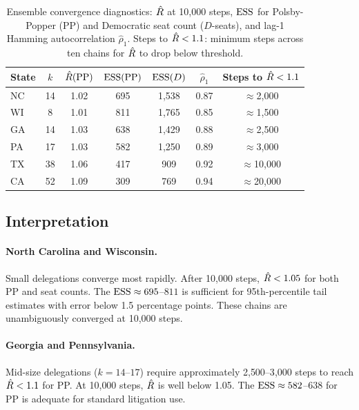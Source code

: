 \begin{table}[h]
\centering
\caption{Ensemble convergence diagnostics: $\hat{R}$ at 10{,}000 steps,
         $\mathrm{ESS}$ for Polsby-Popper (PP) and Democratic seat count ($D$-seats),
         and lag-1 Hamming autocorrelation $\hat{\rho}_1$.
         Steps to $\hat{R} < 1.1$: minimum steps across ten chains for
         $\hat{R}$ to drop below threshold.}
\label{tab:diagnostics}
\begin{tabular}{lcccccc}
\toprule
State & $k$ & $\hat{R}(\mathrm{PP})$ & $\mathrm{ESS}(\mathrm{PP})$ & $\mathrm{ESS}(D)$ & $\hat{\rho}_1$ & Steps to $\hat{R}<1.1$ \\
\midrule
NC & 14 & 1.02 & 695  & 1{,}538 & 0.87 & $\approx$2{,}000 \\
WI &  8 & 1.01 & 811 & 1{,}765 & 0.85 & $\approx$1{,}500 \\
GA & 14 & 1.03 & 638  & 1{,}429 & 0.88 & $\approx$2{,}500 \\
PA & 17 & 1.03 & 582  & 1{,}250 & 0.89 & $\approx$3{,}000 \\
TX & 38 & 1.06 & 417  &   909   & 0.92 & $\approx$10{,}000 \\
CA & 52 & 1.09 & 309  &   769   & 0.94 & $\approx$20{,}000 \\
\bottomrule
\end{tabular}
\end{table}

\subsection{Interpretation}

\paragraph{North Carolina and Wisconsin.}
Small delegations converge most rapidly.
After 10{,}000 steps, $\hat{R} < 1.05$ for both PP and seat counts.
The $\mathrm{ESS} \approx 695$--$811$ is sufficient for 95th-percentile
tail estimates with error below 1.5 percentage points.
These chains are unambiguously converged at 10{,}000 steps.

\paragraph{Georgia and Pennsylvania.}
Mid-size delegations ($k = 14$--$17$) require approximately 2{,}500--3{,}000
steps to reach $\hat{R} < 1.1$ for PP.
At 10{,}000 steps, $\hat{R}$ is well below 1.05.
The $\mathrm{ESS} \approx 582$--$638$ for PP is adequate for standard litigation use.

